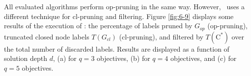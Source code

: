 All evaluated algorithms perform op-pruning in the same way. However, \namoate \ uses a different technique for cl-pruning and filtering. Figure \ref{fig:6-9} displays some results of the execution of \namoate: the percentage of labels pruned by $G_{op}$ (op-pruning), truncated closed node labels $T(G_{cl})$ (cl-pruning), and filtered by  $T(\text{C}^*)$ over the total number of discarded labels. Results are displayed as a function of solution depth $d$, (a) for $q=3$ objectives, (b) for $q=4$ objectives, and (c) for $q=5$ objectives. 

\begin{figure}
    \begin{center}
%
      \\ %
      \\ %
\end{center}
\end{figure}
